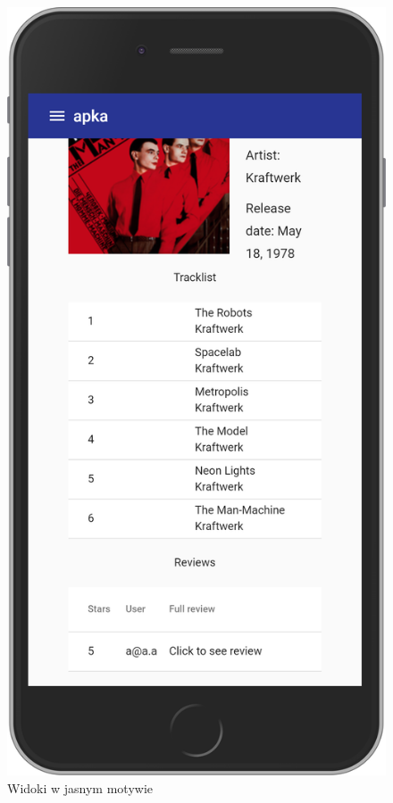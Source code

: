 \begin{figure}[H]
		\begin{minipage}{0.5\textwidth}
			\includegraphics[width=0.9\linewidth]{rys06/album_light.png}
		\end{minipage}
		\caption{Widoki w jasnym motywie}
		\label{fig:light}
	\end{figure}